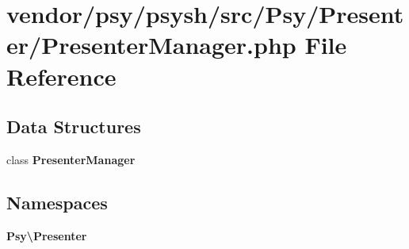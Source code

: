 \section{vendor/psy/psysh/src/\+Psy/\+Presenter/\+Presenter\+Manager.php File Reference}
\label{_presenter_manager_8php}
\subsection*{Data Structures}
\begin{DoxyCompactItemize}
\item 
class {\bf Presenter\+Manager}
\end{DoxyCompactItemize}
\subsection*{Namespaces}
\begin{DoxyCompactItemize}
\item 
 {\bf Psy\textbackslash{}\+Presenter}
\end{DoxyCompactItemize}
